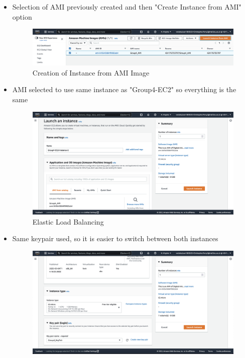 \begin{itemize}
	\item Selection of AMI previously created and then "Create Instance from AMI" option \begin{figure}[!htbp]
	      \centering
	      \includegraphics[width=\textwidth]{resources/elb/elb-instance-from-ami.png}
	      \caption{Creation of Instance from AMI Image}
	      \label{fig:elb-instance-from-ami}
	\end{figure}
	\item AMI selected to use same instance as "Group4-EC2" so everything is the same \begin{figure}[!htbp]
	      \centering
	      \includegraphics[width=\textwidth]{resources/elb/elb-instance-2-name.png}
	      \caption{Elastic Load Balancing}
	      \label{fig:elb-instance-2-name}
	\end{figure}
	\item Same keypair used, so it is easier to switch between both instances \begin{figure}[!htbp]
	      \centering
	      \includegraphics[width=\textwidth]{resources/elb/elb-instance-2-type-and-keypair.png}

\end{figure}
\end{itemize}
